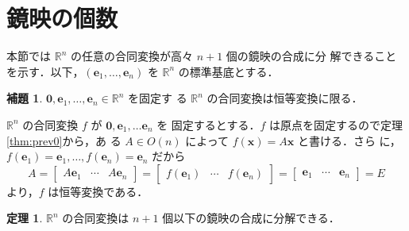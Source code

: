 \documentclass[11pt, uplatex, dvipdfmx, titlepage]{jsarticle}
\makeatletter
\renewenvironment{proof}[1][\proofname]{\par
  \pushQED{\qed}%
  \normalfont \topsep6\p@\@plus6\p@\relax
  \trivlist
  \item[\hskip\labelsep
         \bfseries
    {#1}]\ignorespaces
}{%
  \popQED\endtrivlist\@endpefalse
}
\theoremstyle{definition}
\newtheorem{theorem}{定理}[section]
\newtheorem{lemma}{補題}[section]
\renewcommand{\proofname}{\textbf{証明}}
\makeatother
\begin{document}
\section{鏡映の個数}\label{sec:n+1-reflection}

本節では $\mathbb{R}^n$ の任意の合同変換が高々 $n+1$ 個の鏡映の合成に分
解できることを示す．以下，$(\bm{e}_1, \ldots, \bm{e}_n)
$ を $\mathbb{R}^n$ の標準基底とする．

\begin{lemma}\label{lem:0id}
  $\bm{0}, \bm{e}_1, \ldots, \bm{e}_n \in \mathbb{R}^n$ を固定す
  る $\mathbb{R}^n$ の合同変換は恒等変換に限る．
\end{lemma}

\begin{proof}
  $\mathbb{R}^n$ の合同変換 $f$ が $\bm{0}, \bm{e}_1, \ldots \bm{e}_n$ を
  固定するとする．$f$ は原点を固定するので定理\ref{thm:prev0}から，あ
  る $A \in O(n)$ によって $f(\bm{x}) = A\bm{x}$ と書ける．さら
  に，$f(\bm{e}_1) = \bm{e}_1, \ldots, f(\bm{e}_n) = \bm{e}_n$ だから
  \[
    A=\left[
     \begin{array}{ccc}
       A\bm{e}_1 & \cdots & A\bm{e}_n
     \end{array}
   \right]=\left[
     \begin{array}{ccc}
       f(\bm{e}_1) & \cdots & f(\bm{e}_n)
     \end{array}
   \right]=\left[
      \begin{array}{ccc}
        \bm{e}_1 & \cdots & \bm{e}_n
      \end{array}
    \right] =E
  \]
  より，$f$ は恒等変換である．
\end{proof}

\begin{theorem}
  $\mathbb{R}^n$ の合同変換は $n+1$ 個以下の鏡映の合成に分解できる．
\end{theorem}
\end{document}

